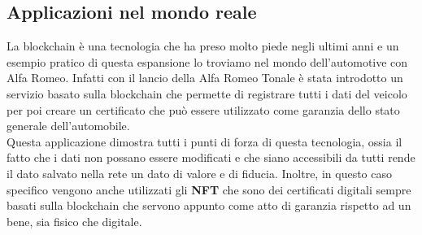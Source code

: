 \subsection{Applicazioni nel mondo reale}
La blockchain è una tecnologia che ha preso molto piede negli ultimi anni e 
un esempio pratico di questa espansione lo troviamo nel mondo dell'automotive
con Alfa Romeo. Infatti con il lancio della Alfa Romeo Tonale è stata introdotto
un servizio basato sulla blockchain che permette di registrare tutti i dati del
veicolo per poi creare un certificato che può essere utilizzato come garanzia 
dello stato generale dell'automobile. \\
Questa applicazione dimostra tutti i punti di forza di questa tecnologia, ossia
il fatto che i dati non possano essere modificati e che siano accessibili da
tutti rende il dato salvato nella rete un dato di valore e di fiducia. Inoltre, 
in questo caso specifico vengono anche utilizzati gli \textbf{NFT} che sono
dei certificati digitali sempre basati sulla blockchain che servono appunto
come atto di garanzia rispetto ad un bene, sia fisico che digitale.

